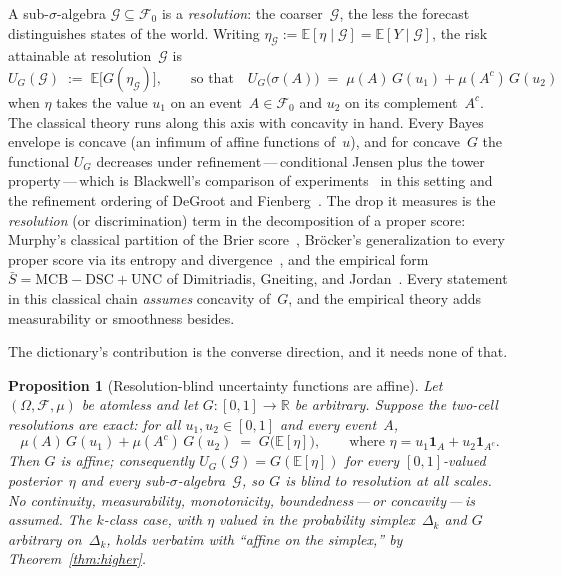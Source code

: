 \documentclass{article}
\theoremstyle{plain}
\newtheorem{proposition}[theorem]{Proposition}
\theoremstyle{definition}
\newcommand{\R}{\mathbb{R}}
\newcommand{\E}{\mathbb{E}}
\begin{document}
A sub-$\sigma$-algebra $\mathcal{G}\subseteq\mathcal{F}_0$ is a
\emph{resolution}: the coarser~$\mathcal{G}$, the less the forecast
distinguishes states of the world. Writing
$\eta_{\mathcal{G}}:=\E[\eta\mid\mathcal{G}] = \E[Y\mid\mathcal{G}]$, the risk attainable at
resolution~$\mathcal{G}$ is
\[
U_G(\mathcal{G})\;:=\;\E\bigl[G(\eta_{\mathcal{G}})\bigr],
\qquad\text{so that}\quad
U_G\bigl(\sigma(A)\bigr)\;=\;\mu(A)\,G(u_1)+\mu(A^{c})\,G(u_2)
\]
when $\eta$ takes the value $u_1$ on an event~$A\in\mathcal{F}_0$ and $u_2$ on its complement~$A^{c}$.
The classical theory runs along this axis with concavity in hand.
Every Bayes envelope is concave (an infimum of affine functions
of~$u$), and for concave~$G$ the functional $U_G$ decreases under
refinement\,---\,conditional Jensen plus the tower
property\,---\,which is Blackwell's comparison of
experiments~\cite{Blackwell1953} in this setting and the refinement
ordering of DeGroot and Fienberg~\cite{DeGrootFienberg1983}. The drop
it measures is the \emph{resolution} (or discrimination) term in the
decomposition of a proper score: Murphy's classical partition of the
Brier score~\cite{Murphy1973}, Br\"ocker's generalization to every
proper score via its entropy and divergence~\cite{Brocker2009}, and
the empirical form
$\bar S=\mathrm{MCB}-\mathrm{DSC}+\mathrm{UNC}$ of Dimitriadis,
Gneiting, and Jordan~\cite{DGJ2021}. Every statement in this
classical chain \emph{assumes} concavity of~$G$, and the empirical
theory adds measurability or smoothness besides.

The dictionary's contribution is the converse direction, and it needs
none of that.

\begin{proposition}[Resolution-blind uncertainty functions are affine]
\label{prop:resolution}
Let $(\Omega,\mathcal{F},\mu)$ be atomless and let
$G\colon[0,1]\to\R$ be arbitrary. Suppose the two-cell resolutions
are exact: for all $u_1,u_2\in[0,1]$ and every event~$A$,
\[
\mu(A)\,G(u_1)+\mu(A^{c})\,G(u_2)\;=\;G\bigl(\E[\eta]\bigr),
\qquad\text{where } \eta=u_1\mathbf{1}_A+u_2\mathbf{1}_{A^{c}}.
\]
Then $G$ is affine; consequently $U_G(\mathcal{G})=G(\E[\eta])$ for
\emph{every} $[0,1]$-valued posterior~$\eta$ and \emph{every}
sub-$\sigma$-algebra~$\mathcal{G}$, so $G$ is blind to resolution at
all scales. No continuity, measurability, monotonicity,
boundedness\,---\,or concavity\,---\,is assumed. The $k$-class case,
with $\eta$ valued in the probability simplex~$\Delta_k$ and $G$
arbitrary on~$\Delta_k$, holds verbatim with ``affine on the
simplex,'' by Theorem~\ref{thm:higher}.
\end{proposition}
\end{document}
